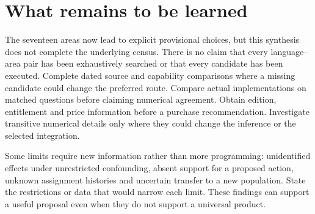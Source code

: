 \section{What remains to be learned}
The seventeen areas now lead to explicit provisional choices, but this synthesis
does not complete the underlying census. There is no claim that every
language--area pair has been exhaustively searched or that every candidate has
been executed. Complete dated source and capability comparisons where a missing
candidate could change the preferred route. Compare actual implementations on
matched questions before claiming numerical agreement. Obtain edition,
entitlement and price information before a purchase recommendation. Investigate
transitive numerical details only where they could change the inference or
the selected integration.

Some limits require new information rather than more programming: unidentified
effects under unrestricted confounding, absent support for a proposed action,
unknown assignment histories and uncertain transfer to a new population. State
the restrictions or data that would narrow each limit. These findings can
support a useful proposal even when they do not support a universal product.

